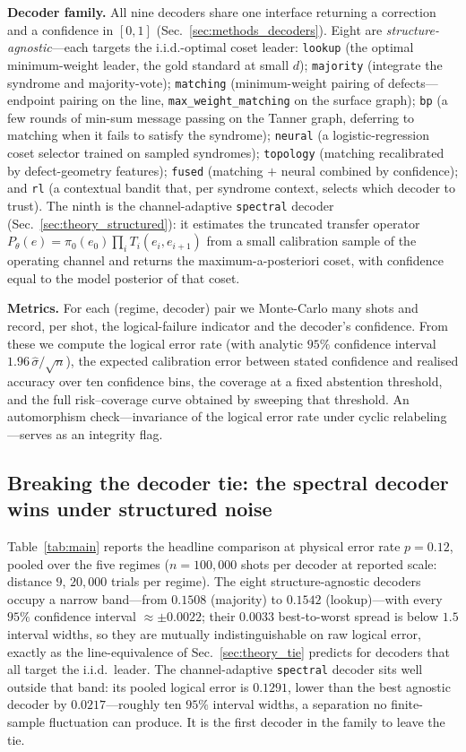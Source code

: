 \documentclass[reprint,aps,prxquantum,amsmath,amssymb,floatfix,nofootinbib,longbibliography]{revtex4-2}
\theoremstyle{definition}
\theoremstyle{remark}
\theoremstyle{plain}
\newcommand{\sync}[1]{#1}
\begin{document}
\textbf{Decoder family.} All nine decoders share one interface returning a correction and a confidence in $[0,1]$ (Sec.~\ref{sec:methods_decoders}). Eight are \emph{structure-agnostic}---each targets the i.i.d.-optimal coset leader: \texttt{lookup} (the optimal minimum-weight leader, the gold standard at small $d$); \texttt{majority} (integrate the syndrome and majority-vote); \texttt{matching} (minimum-weight pairing of defects---endpoint pairing on the line, \texttt{max\_weight\_matching} on the surface graph); \texttt{bp} (a few rounds of min-sum message passing on the Tanner graph, deferring to matching when it fails to satisfy the syndrome); \texttt{neural} (a logistic-regression coset selector trained on sampled syndromes); \texttt{topology} (matching recalibrated by defect-geometry features); \texttt{fused} (matching $+$ neural combined by confidence); and \texttt{rl} (a contextual bandit that, per syndrome context, selects which decoder to trust). The ninth is the channel-adaptive \texttt{spectral} decoder (Sec.~\ref{sec:theory_structured}): it estimates the truncated transfer operator $P_\theta(e)=\pi_0(e_0)\prod_i T_i(e_i,e_{i+1})$ from a small calibration sample of the operating channel and returns the maximum-a-posteriori coset, with confidence equal to the model posterior of that coset.

\textbf{Metrics.} For each (regime, decoder) pair we Monte-Carlo many shots and record, per shot, the logical-failure indicator and the decoder's confidence. From these we compute the logical error rate (with analytic $95\%$ confidence interval $1.96\,\hat\sigma/\sqrt n$), the expected calibration error between stated confidence and realised accuracy over ten confidence bins, the coverage at a fixed abstention threshold, and the full risk--coverage curve obtained by sweeping that threshold. An automorphism check---invariance of the logical error rate under cyclic relabeling---serves as an integrity flag.

\subsection{Breaking the decoder tie: the spectral decoder wins under structured noise}
\label{sec:headline}

Table~\ref{tab:main} reports the headline comparison at physical error rate $p=\sync{0.12}$, pooled over the five regimes ($n=\sync{100{,}000}$ shots per decoder at reported scale: distance $\sync{9}$, $\sync{20{,}000}$ trials per regime). The eight structure-agnostic decoders occupy a narrow band---from $\sync{0.1508}$ (majority) to $\sync{0.1542}$ (lookup)---with every $95\%$ confidence interval $\approx\pm\sync{0.0022}$; their $\sync{0.0033}$ best-to-worst spread is below $1.5$ interval widths, so they are mutually indistinguishable on raw logical error, exactly as the line-equivalence of Sec.~\ref{sec:theory_tie} predicts for decoders that all target the i.i.d.\ leader. The channel-adaptive \texttt{spectral} decoder sits well outside that band: its pooled logical error is $\sync{0.1291}$, lower than the best agnostic decoder by $\sync{0.0217}$---roughly ten $95\%$ interval widths, a separation no finite-sample fluctuation can produce. It is the first decoder in the family to leave the tie.
\end{document}
